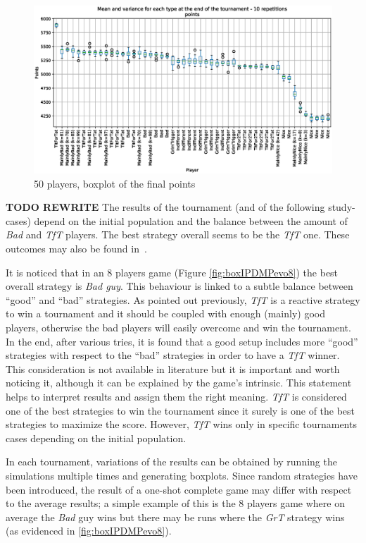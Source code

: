 \documentclass[journal,a4paper,10pt,twoside]{IEEEtran} %
\begin{document}
\begin{figure}[!ht]
    \centering
    \includegraphics[width=1\columnwidth]{../img/ipdmp/ipdmp-boxplot-final-points-50}
    \caption{50 players, boxplot of the final points}
    \label{fig:boxIPDMPfinal}
\end{figure}

\textbf{TODO REWRITE}
The results of the tournament (and of the following study-cases) depend on the initial population and the balance between the amount of \textit{Bad} and \textit{TfT} players. The best strategy overall seems to be the \textit{TfT} one.
These outcomes may also be found in~\cite{mathieu2017}.

It is noticed that in an 8 players game (Figure \ref{fig:boxIPDMPevo8}) the best overall strategy is \textit{Bad guy}. This behaviour is linked to a subtle balance between ``good'' and ``bad'' strategies. As pointed out previously, \textit{TfT} is a reactive strategy to win a tournament and it should be coupled with enough (mainly) good players, otherwise the bad players will easily overcome and win the tournament. In the end, after various tries, it is found that a good setup includes more ``good'' strategies with respect to the ``bad'' strategies in order to have a \textit{TfT} winner. This consideration is not available in literature but it is important and worth noticing it, although it can be explained by the game's intrinsic. This statement helps to interpret results and assign them the right meaning. \textit{TfT} is considered one of the best strategies to win the tournament since it surely is one of the best strategies to maximize the score. However, \textit{TfT} wins only in specific tournaments cases depending on the initial population.

In each tournament, variations of the results can be obtained by running the simulations multiple times and generating boxplots.
Since random strategies have been introduced, the result of a one-shot complete game may differ with respect to the average results; a simple example of this is the 8 players game where on average the \textit{Bad} guy wins but there may be runs where the \textit{GrT} strategy wins (as evidenced in \autoref{fig:boxIPDMPevo8}).
\end{document}
